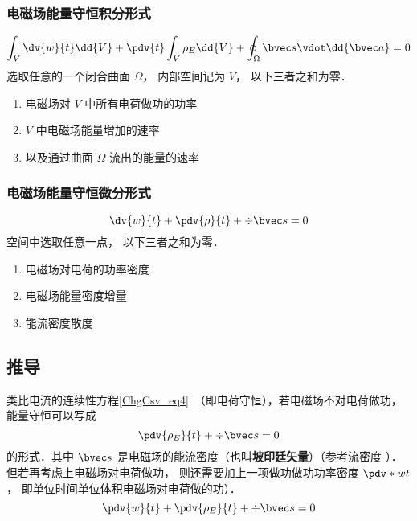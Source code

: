 \subsubsection{电磁场能量守恒积分形式}
\begin{equation}
\int_V \dv{w}{t} \dd{V}  + \pdv{t} \int_V \rho_E \dd{V}  + \oint_\Omega  \bvec s \vdot \dd{\bvec a}  = 0
\end{equation} 
选取任意的一个闭合曲面 $\Omega $， 内部空间记为 $V$， 以下三者之和为零．
\begin{enumerate}
\item 电磁场对 $V$ 中所有电荷做功的功率
\item $V$ 中电磁场能量增加的速率
\item 以及通过曲面 $\Omega $ 流出的能量的速率
\end{enumerate}

\subsubsection{电磁场能量守恒微分形式}
\begin{equation}
\dv{w}{t} + \pdv{\rho}{t} + \div \bvec s = 0
\end{equation} 
空间中选取任意一点， 以下三者之和为零．
\begin{enumerate}
\item 电磁场对电荷的功率密度
\item 电磁场能量密度增量
\item 能流密度散度
\end{enumerate}

\subsection{推导}
类比电流的连续性方程\autoref{ChgCsv_eq4}~（即电荷守恒），若电磁场不对电荷做功，能量守恒可以写成
\begin{equation}
\pdv{\rho_E}{t} + \div \bvec s = 0
\end{equation} 
的形式．其中 $\bvec s$ 是电磁场的能流密度（也叫\textbf{坡印廷矢量}）（参考流密度%
）．但若再考虑上电磁场对电荷做功， 则还需要加上一项做功做功功率密度 $\pdv*{w}{t}$， 即单位时间单位体积电磁场对电荷做的功）．
\begin{equation}\label{EBS_eq1}
\pdv{w}{t} + \pdv{\rho_E}{t} + \div \bvec s = 0
\end{equation} 

